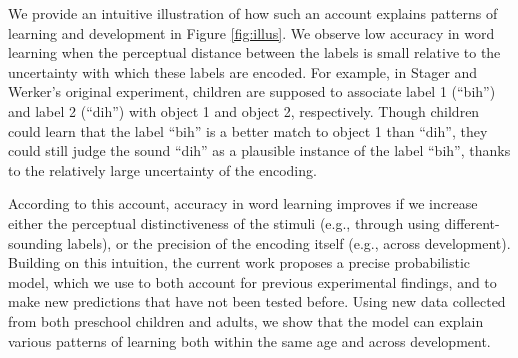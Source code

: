\documentclass[10pt, letterpaper]{article}
\begin{document}
We provide an intuitive illustration of how such an account explains
patterns of learning and development in Figure \ref{fig:illus}. We
observe low accuracy in word learning when the perceptual distance
between the labels is small relative to the uncertainty with which these
labels are encoded. For example, in Stager and Werker's original
experiment, children are supposed to associate label 1 (``bih'') and
label 2 (``dih'') with object 1 and object 2, respectively. Though
children could learn that the label ``bih'' is a better match to object
1 than ``dih'', they could still judge the sound ``dih'' as a plausible
instance of the label ``bih'', thanks to the relatively large
uncertainty of the encoding.

According to this account, accuracy in word learning improves if we
increase either the perceptual distinctiveness of the stimuli (e.g.,
through using different-sounding labels), or the precision of the
encoding itself (e.g., across development). Building on this intuition,
the current work proposes a precise probabilistic model, which we use to
both account for previous experimental findings, and to make new
predictions that have not been tested before. Using new data collected
from both preschool children and adults, we show that the model can
explain various patterns of learning both within the same age and across
development.
\end{document}
